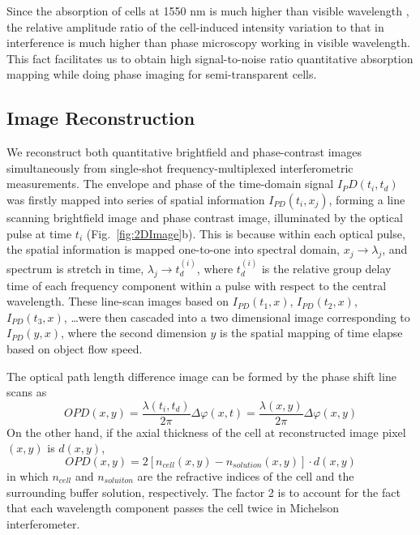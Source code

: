 \documentclass[aps,pra,reprint,superscriptaddress]{revtex4-1}
\begin{document}
Since the absorption of cells at 1550 nm is much higher than visible wavelength \cite{roggan1999optical}, the relative amplitude ratio of the cell-induced intensity variation to that in interference is much higher than phase microscopy working in visible wavelength. This fact facilitates us to obtain high signal-to-noise ratio quantitative absorption mapping while doing phase imaging for semi-transparent cells. 



\subsection{Image Reconstruction}

We reconstruct both quantitative brightfield and phase-contrast images simultaneously from single-shot frequency-multiplexed interferometric measurements. The envelope and phase of the time-domain signal $I_PD (t_i,t_d)$ was firstly mapped into series of spatial information $I_{PD}(t_i,x_j)$, forming a line scanning brightfield image and phase contrast image, illuminated by the optical pulse at time $t_i$ (Fig.~\ref{fig:2DImage}b). This is because within each optical pulse, the spatial information is mapped one-to-one into spectral domain, $x_j \rightarrow \lambda_j$, and spectrum is stretch in time, $\lambda_j \rightarrow t_d^{(i)}$, where $t_d^{(i)}$ is the relative group delay time of each frequency component within a pulse with respect to the central wavelength. These line-scan images based on $I_{PD}(t_1,x)$, $I_{PD} (t_2,x)$, $I_{PD} (t_3,x)$, \ldots were then cascaded into a two dimensional image corresponding to $I_{PD}(y,x)$, where the second dimension $y$ is the spatial mapping of time elapse based on object flow speed. 

The optical path length difference image can be formed by the phase shift line scans as
\begin{equation}
OPD(x,y) = \frac{\lambda(t_i,t_d)}{2\pi} \Delta\varphi(x,t) = \frac{\lambda(x,y)}{2\pi} \Delta\varphi(x,y)
\end{equation}
On the other hand, if the axial thickness of the cell at reconstructed image pixel $(x,y)$ is $d(x,y)$,
\begin{equation}
OPD(x,y) = 2 [n_{cell}(x,y) - n_{solution}(x,y)] \cdot d(x,y)
\end{equation}
in which $n_{cell}$ and $n_{soluiton}$ are the refractive indices of the cell and the surrounding buffer solution, respectively. The factor 2 is to account for the fact that each wavelength component passes the cell twice in Michelson interferometer. 
\end{document}
